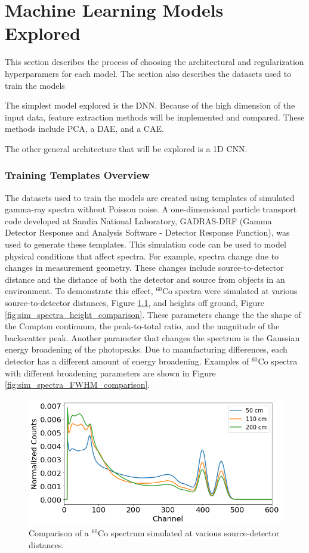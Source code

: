 \chapter{Machine Learning Models Explored}

This section describes the process of choosing the architectural and regularization hyperparamers for each model. The section also describes the datasets used to train the models 

The simplest model explored is the DNN. Because of the high dimension of the input data, feature extraction methods will be implemented and compared. These methods include PCA, a DAE, and a CAE. 

The other general architecture that will be explored is a 1D CNN. 

\subsection{Training Templates Overview}

The datasets used to train the models are created using templates of simulated gamma-ray spectra without Poisson noise. A one-dimensional particle transport code developed at Sandia National Laboratory, GADRAS-DRF (Gamma Detector Response and Analysis Software - Detector Response Function), was used to generate these templates. This simulation code can be used to model physical conditions that affect spectra. For example, spectra change due to changes in measurement geometry. These changes include source-to-detector distance and the distance of both the detector and source from objects in an environment. To demonstrate this effect, $^{60}$Co spectra were simulated at various source-to-detector distances, Figure \ref{fig:sim_spectra_distance_comparison}, and heights off ground, Figure \ref{fig:sim_spectra_height_comparison}. These parameters change the the shape of the Compton continuum, the peak-to-total ratio, and the magnitude of the backscatter peak. Another parameter that changes the spectrum is the Gaussian energy broadening of the photopeaks. Due to manufacturing differences, each detector has a different amount of energy broadening. Examples of $^{60}$Co spectra with different broadening parameters are shown in Figure \ref{fig:sim_spectra_FWHM_comparison}.


\begin{figure}[H]
\centering
\includegraphics[width=0.75\linewidth]{images/sim_spectra_distance_comparison}
\caption{Comparison of a $^{60}$Co spectrum simulated at various source-detector distances.}
\label{fig:sim_spectra_distance_comparison}
\end{figure}

